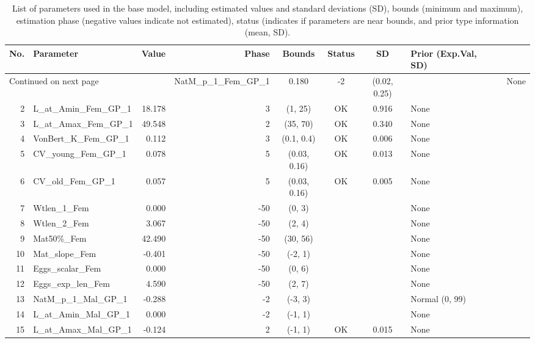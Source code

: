 \documentclass[12pt,]{article}
\begin{document}
\begin{landscape}
\begin{longtable}{rlrrcccl}
\caption{List of parameters used in
                                              the base model, including estimated 
                                              values and standard deviations (SD), 
                                              bounds (minimum and maximum), 
                                              estimation phase (negative values indicate
                                              not estimated), status (indicates if 
                                              parameters are near bounds, and prior type
                                              information (mean, SD).} \\ 
  \hline
No. & Parameter & Value & Phase & Bounds & Status & SD & Prior (Exp.Val, SD)  \\ 
  \hline 
\endhead 
\hline 
\multicolumn{3}{l}{\footnotesize Continued on next page} 
\endfoot 
\endlastfoot 
 \hline
1 & NatM\_p\_1\_Fem\_GP\_1 & 0.180 & -2 & (0.02, 0.25) &  &  & None \\ 
  2 & L\_at\_Amin\_Fem\_GP\_1 & 18.178 & 3 & (1, 25) & OK & 0.916 & None \\ 
  3 & L\_at\_Amax\_Fem\_GP\_1 & 49.548 & 2 & (35, 70) & OK & 0.340 & None \\ 
  4 & VonBert\_K\_Fem\_GP\_1 & 0.112 & 3 & (0.1, 0.4) & OK & 0.006 & None \\ 
  5 & CV\_young\_Fem\_GP\_1 & 0.078 & 5 & (0.03, 0.16) & OK & 0.013 & None \\ 
  6 & CV\_old\_Fem\_GP\_1 & 0.057 & 5 & (0.03, 0.16) & OK & 0.005 & None \\ 
  7 & Wtlen\_1\_Fem & 0.000 & -50 & (0, 3) &  &  & None \\ 
  8 & Wtlen\_2\_Fem & 3.067 & -50 & (2, 4) &  &  & None \\ 
  9 & Mat50\%\_Fem & 42.490 & -50 & (30, 56) &  &  & None \\ 
  10 & Mat\_slope\_Fem & -0.401 & -50 & (-2, 1) &  &  & None \\ 
  11 & Eggs\_scalar\_Fem & 0.000 & -50 & (0, 6) &  &  & None \\ 
  12 & Eggs\_exp\_len\_Fem & 4.590 & -50 & (2, 7) &  &  & None \\ 
  13 & NatM\_p\_1\_Mal\_GP\_1 & -0.288 & -2 & (-3, 3) &  &  & Normal (0, 99) \\ 
  14 & L\_at\_Amin\_Mal\_GP\_1 & 0.000 & -2 & (-1, 1) &  &  & None \\ 
  15 & L\_at\_Amax\_Mal\_GP\_1 & -0.124 & 2 & (-1, 1) & OK & 0.015 & None \\ 

\end{longtable}
\end{landscape}
\end{document}
